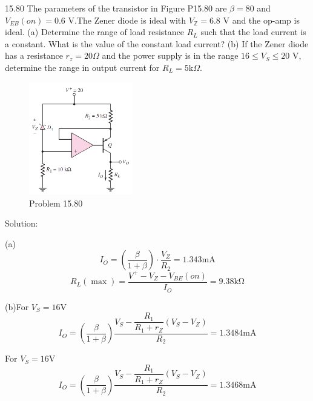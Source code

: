 \documentclass[a4paper,11pt,UTF8]{afthesis}
\begin{document}
15.80 The parameters of the transistor in Figure P15.80 are $\beta=80$ and $V_{EB}( on) = 0.6$ V.The Zener diode is ideal with $V_{\mathbb{Z}}=6.8$ V and the op-amp is ideal. (a) Determine the range of load resistance $R_L$ such that the load current is a constant. What is the value of the constant load current? (b) If the Zener diode has a resistance $r_z=20\Omega$ and the power supply is in the range $16\leq V_S\leq20$ V, determine the range in output current for 
$R_L= 5$k$\Omega.$
\begin{figure}[H]
	\centering
	\includegraphics[width=0.4\textwidth]{15.80}
	\caption{Problem 15.80}
\end{figure}
\noindent Solution:

(a)
	$$I_{O}=\left(\frac{\beta}{1+\beta}\right)\cdot \frac{V_Z}{R_2}=1.343\mathrm{mA}$$
	$$R_L(\max)=\frac{V^+-V_Z-V_{BE}(on)}{I_O}=9.38\mathrm{k\Omega}$$
	
(b)For $V_S=16$V
$$
	I_O=\left(\frac{\beta}{1+\beta}\right)\dfrac{V_S-\dfrac{R_1}{R_1+r_Z}(V_S-V_Z)}{R_2}=1.3484\mathrm{mA}
$$

For $V_S=16$V
$$
I_O=\left(\frac{\beta}{1+\beta}\right)\dfrac{V_S-\dfrac{R_1}{R_1+r_Z}(V_S-V_Z)}{R_2}=1.3468\mathrm{mA}
$$
\end{document}
